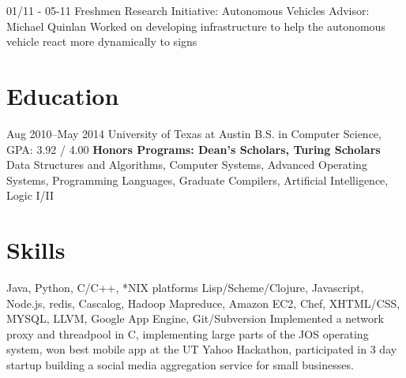 \documentclass[11pt,letter,sans]{moderncv}
\begin{document}
\cventry
{01/11 - 05-11}
{Freshmen Research Initiative: Autonomous Vehicles}
{Advisor: Michael Quinlan}
{}
{}
{Worked on developing infrastructure to help the autonomous vehicle react more
dynamically to signs} 

\section{Education}

\cventry
  {Aug 2010--May 2014}
  {University of Texas at Austin}
  {B.S. in Computer Science, GPA: 3.92 / 4.00}
  {\textbf{Honors Programs: Dean's Scholars, Turing Scholars}}
  {}
  {}
  { Data Structures and Algorithms, Computer
    Systems, Advanced Operating Systems, Programming Languages, Graduate
  Compilers, Artificial Intelligence, Logic I/II}

  \section{Skills}
  {Java, Python, C/C++, *NIX platforms}
  {Lisp/Scheme/Clojure, Javascript, Node.js, redis, Cascalog, Hadoop Mapreduce,
  Amazon EC2, Chef, XHTML/CSS, MYSQL, LLVM, Google App Engine, Git/Subversion }
  {Implemented a network proxy and threadpool in C, implementing large parts of
  the JOS operating system, won best mobile app at the UT Yahoo Hackathon,
  participated in 3 day startup building a social media aggregation service for
small businesses.}


  
\end{document}
